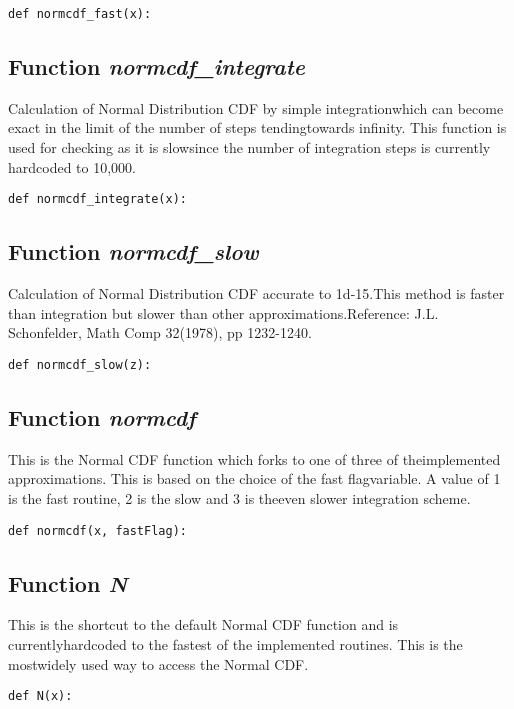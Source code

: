 \documentclass[twoside,11pt]{book}
\begin{document}
\begin{lstlisting}
def normcdf_fast(x):
\end{lstlisting}

\subsection{Function {\it normcdf\_integrate}}
Calculation of Normal Distribution CDF by simple integrationwhich can become exact in the limit of the number of steps tendingtowards infinity. This function is used for checking as it is slowsince the number of integration steps is currently hardcoded to 10,000.

\begin{lstlisting}
def normcdf_integrate(x):
\end{lstlisting}

\subsection{Function {\it normcdf\_slow}}
Calculation of Normal Distribution CDF accurate to 1d-15.This method is faster than integration but slower than other approximations.Reference: J.L. Schonfelder, Math Comp 32(1978), pp 1232-1240. 

\begin{lstlisting}
def normcdf_slow(z):
\end{lstlisting}

\subsection{Function {\it normcdf}}
This is the Normal CDF function which forks to one of three of theimplemented approximations. This is based on the choice of the fast flagvariable. A value of 1 is the fast routine, 2 is the slow and 3 is theeven slower integration scheme. 

\begin{lstlisting}
def normcdf(x, fastFlag):
\end{lstlisting}

\subsection{Function {\it N}}
This is the shortcut to the default Normal CDF function and is currentlyhardcoded to the fastest of the implemented routines. This is the mostwidely used way to access the Normal CDF. 

\begin{lstlisting}
def N(x):
\end{lstlisting}
\end{document}
